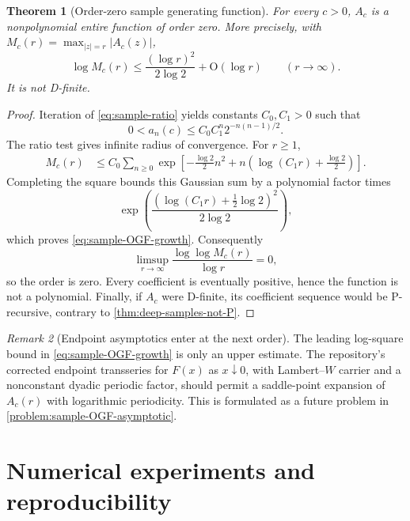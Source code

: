 \documentclass[11pt]{article}
\numberwithin{equation}{section}
\newtheorem{theorem}{Theorem}[section]
\theoremstyle{definition}
\theoremstyle{remark}
\newtheorem{remark}[theorem]{Remark}
\newcommand{\Oh}{\mathrm O}
\newcommand{\abs}[1]{\left\lvert#1\right\rvert}
\begin{document}
\begin{theorem}[Order-zero sample generating function]
\label{thm:sample-OGF-order-zero}
For every $c>0$, $A_c$ is a nonpolynomial entire function of order zero.  More
precisely, with
$M_c(r)=\max_{\abs z=r}\abs{A_c(z)}$,
\begin{equation}
 \log M_c(r)
 \le\frac{(\log r)^2}{2\log2}+\Oh(\log r)
 \qquad(r\to\infty).
 \label{eq:sample-OGF-growth}
\end{equation}
It is not D-finite.
\end{theorem}
\begin{proof}
Iteration of \eqref{eq:sample-ratio} yields constants $C_0,C_1>0$ such that
\begin{equation}
 0<a_n(c)\le C_0C_1^n2^{-n(n-1)/2}.
 \label{eq:sample-coefficient-upper}
\end{equation}
The ratio test gives infinite radius of convergence.  For $r\ge1$,
\begin{align*}
 M_c(r)
 &\le C_0\sum_{n\ge0}
 \exp\left[-\frac{\log2}{2}n^2
 +n\left(\log(C_1r)+\frac{\log2}{2}\right)\right].
\end{align*}
Completing the square bounds this Gaussian sum by a polynomial factor times
\[
 \exp\left(
 \frac{(\log(C_1r)+\frac12\log2)^2}{2\log2}
 \right),
\]
which proves \eqref{eq:sample-OGF-growth}.  Consequently
\[
 \limsup_{r\to\infty}
 \frac{\log\log M_c(r)}{\log r}=0,
\]
so the order is zero.  Every coefficient is eventually positive, hence the
function is not a polynomial.  Finally, if $A_c$ were D-finite, its coefficient
sequence would be P-recursive, contrary to
\cref{thm:deep-samples-not-P}.
\end{proof}

\begin{remark}[Endpoint asymptotics enter at the next order]
The leading log-square bound in \eqref{eq:sample-OGF-growth} is only an upper
estimate.  The repository's corrected endpoint transseries for $F(x)$ as
$x\downarrow0$, with Lambert--$W$ carrier and a nonconstant dyadic periodic
factor, should permit a saddle-point expansion of $A_c(r)$ with logarithmic
periodicity.  This is formulated as a future problem in
\cref{problem:sample-OGF-asymptotic}.
\end{remark}

\section{Numerical experiments and reproducibility}
\label{sec:numerics}
\end{document}
